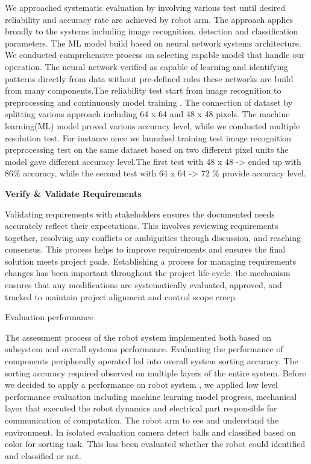  We approached systematic evaluation by involving various test until desired reliability and accuracy rate are achieved by robot arm. The approach applies broadly to the systems including image recognition, detection and classification parameters. The ML model build based on neural network systems architecture. We conducted comprehensive process on selecting capable model that handle our operation. The neural network verified as capable of learning and identifying patterns directly from data without pre-defined rules these networks are build from many components.The reliability test start from image recognition to preprocessing and continuously model training . The connection of dataset by splitting various approach including 64 x 64 and 48 x 48 pixels. The machine learning(ML) model proved various accuracy level, while we conducted multiple resolution test. For instance once we launched training test image recognition preprocessing test on the same dataset based on two different pixel units the model gave different accuracy level.The first test with 48 x 48 -> ended up with 86\% accuracy, while the second test with 64 x 64 -> 72 \% provide accuracy level.


 \textbf{Verify \& Validate Requirements}

Validating requirements with stakeholders ensures the documented needs accurately reflect their expectations. This involves reviewing requirements together, resolving any conflicts or ambiguities through discussion, and reaching consensus. This process helps to improve requirements and ensures the final solution meets project goals. Establishing a process for managing requirements changes has been important throughout the project life-cycle.  the mechanism  ensures that any modifications are systematically evaluated, approved, and tracked to maintain project alignment and control scope creep.

  Evaluation performance 

The assessment process of the robot system implemented both based on subsystem and overall systems performance. Evaluating the performance of components peripherally operated led into overall system sorting accuracy. The sorting accuracy required observed on multiple layers of the entire system. Before we decided  to  apply a performance on robot system , we applied low level performance evaluation including machine learning model progress, mechanical layer that executed the robot dynamics and electrical part responsible for communication of computation. The robot arm to see and understand the environment. In isolated evaluation camera detect balls and classified based on color for sorting task. This has been evaluated whether  the robot could identified and classified or not.


